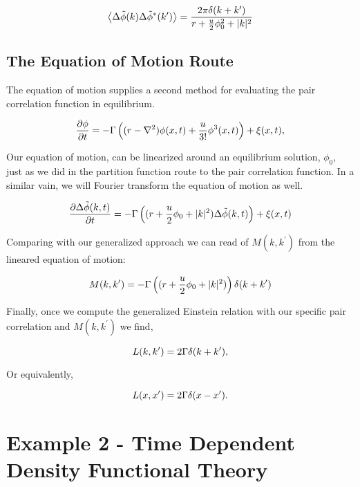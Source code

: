 \begin{equation} \left\langle \Delta\tilde{\phi}(k)\Delta\tilde{\phi}^{*}(k^\prime) \right\rangle =
\frac{2\pi \delta(k+k^\prime)}{r + \frac{u}{2}\phi_0^2 + \vert k \vert^2}
\end{equation}

\subsection{The Equation of Motion Route}

The equation of motion supplies a second method for evaluating the pair
correlation function in equilibrium.

\begin{equation} \frac{\partial \phi}{\partial t} =
-\Gamma\left((r-\nabla^2)\phi(x,t) + \frac{u}{3!}\phi^3(x,t)\right) + \xi(x, t),
\end{equation}

Our equation of motion, can be linearized around an equilibrium solution,
$\phi_0$, just as we did in the partition function route to the pair
correlation function. In a similar vain, we will Fourier transform the equation
of motion as well.

\begin{equation} \frac{\partial \Delta\tilde{\phi}(k, t)}{\partial t} = -\Gamma\left((r +
\frac{u}{2}\phi_0 + \vert k \vert^2)\Delta\tilde{\phi}(k,t)\right) + \xi(x,t)
\end{equation}

Comparing with our generalized approach we can read of $M(k, k^\prime)$ from
the lineared equation of motion:

\begin{equation} M(k, k^\prime) = -\Gamma\left((r + \frac{u}{2}\phi_0 + \vert k
\vert^2)\right)\delta(k + k^\prime) \end{equation}

Finally, once we compute the generalized Einstein relation with our specific
pair correlation and $M(k, k^\prime)$ we find,

\begin{equation} L(k, k^\prime) = 2\Gamma \delta(k + k^\prime), \end{equation}

Or equivalently,

\begin{equation} L(x, x^\prime) = 2\Gamma \delta(x - x^\prime).  \end{equation}

\section{Example 2 - Time Dependent Density Functional Theory}

